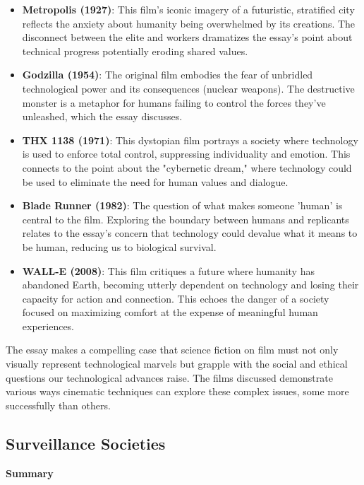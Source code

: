 \documentclass[11pt,fleqn]{book}
\begin{document}
\begin{itemize}
\item \textbf{Metropolis (1927)}:  This film's iconic imagery of a futuristic, stratified city reflects the anxiety about humanity being overwhelmed by its creations. The disconnect between the elite and workers dramatizes the essay's point about technical progress potentially eroding shared values.

\item \textbf{Godzilla (1954)}:  The original film embodies the fear of unbridled technological power and its consequences (nuclear weapons). The destructive monster is a metaphor for humans failing to control the forces they've unleashed, which the essay discusses.

\item \textbf{THX 1138 (1971)}:  This dystopian film portrays a society where technology is used to enforce total control, suppressing individuality and emotion. This connects to the point about the "cybernetic dream," where technology could be used to eliminate the need for human values and dialogue.

\item \textbf{Blade Runner (1982)}:  The question of what makes someone 'human' is central to the film. Exploring the boundary between humans and replicants relates to the essay's concern that technology could devalue what it means to be human, reducing us to biological survival.

\item \textbf{WALL-E (2008)}: This film critiques a future where humanity has abandoned Earth, becoming utterly dependent on technology and losing their capacity for action and connection. This echoes the danger of a society focused on maximizing comfort at the expense of meaningful human experiences. 
\end{itemize}

\vspace{5pt}

The essay makes a compelling case that science fiction on film must not only visually represent technological marvels but grapple with the social and ethical questions our technological advances raise. The films discussed demonstrate various ways cinematic techniques can explore these complex issues, some more successfully than others. 




\subsection{Surveillance Societies}
\textbf{Summary}
\end{document}
